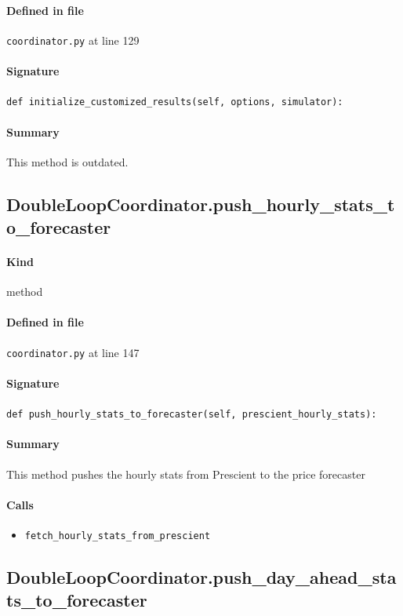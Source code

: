 \documentclass[11pt]{report}
\begin{document}
\paragraph{Defined in file} \texttt{coordinator.py} at line 129
\paragraph{Signature} \texttt{def initialize\_customized\_results(self, options, simulator):}
\paragraph{Summary} This method is outdated.
\subsection{DoubleLoopCoordinator.push\_hourly\_stats\_to\_forecaster}
\label{def:coordinator.py:DoubleLoopCoordinator.push_hourly_stats_to_forecaster:L147}
\paragraph{Kind} method
\paragraph{Defined in file} \texttt{coordinator.py} at line 147
\paragraph{Signature} \texttt{def push\_hourly\_stats\_to\_forecaster(self, prescient\_hourly\_stats):}
\paragraph{Summary} This method pushes the hourly stats from Prescient to the price forecaster
\paragraph{Calls}
\begin{itemize}[leftmargin=*]
  \item \texttt{fetch\_hourly\_stats\_from\_prescient}
\end{itemize}
\subsection{DoubleLoopCoordinator.push\_day\_ahead\_stats\_to\_forecaster}
\label{def:coordinator.py:DoubleLoopCoordinator.push_day_ahead_stats_to_forecaster:L161}
\end{document}
